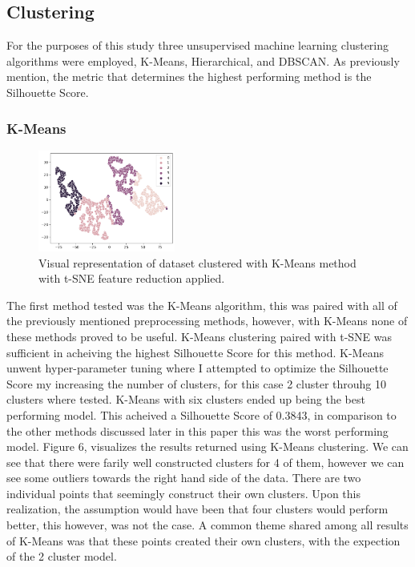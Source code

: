 \documentclass[twocolumn]{article}
\begin{document}
\subsection{Clustering}

For the purposes of this study three unsupervised machine learning clustering algorithms were employed, K-Means, Hierarchical, and DBSCAN. As previously mention, the metric that determines the highest performing method is the Silhouette Score. 

\subsubsection{K-Means}

\begin{figure}
    \centering
    \includegraphics[width=0.4\textwidth]{images/kmeans.png}
    \caption{Visual representation of dataset clustered with K-Means method with t-SNE feature reduction applied.}
\end{figure}

The first method tested was the K-Means algorithm, this was paired with all of the previously mentioned preprocessing methods, however, with K-Means none of these methods proved to be useful. K-Means clustering paired with t-SNE was sufficient in acheiving the highest Silhouette Score for this method. K-Means unwent hyper-parameter tuning where I attempted to optimize the Silhouette Score my increasing the number of clusters, for this case 2 cluster throuhg 10 clusters where tested. K-Means with six clusters ended up being the best performing model. This acheived a Silhouette Score of 0.3843, in comparison to the other methods discussed later in this paper this was the worst performing model. Figure 6, visualizes the results returned using K-Means clustering. We can see that there were farily well constructed clusters for 4 of them, however we can see some outliers towards the right hand side of the data. There are two individual points that seemingly construct their own clusters. Upon this realization, the assumption would have been that four clusters would perform better, this however, was not the case. A common theme shared among all results of K-Means was that these points created their own clusters, with the expection of the 2 cluster model.
\end{document}
